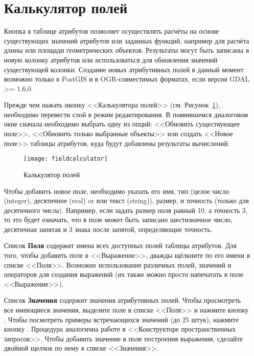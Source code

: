\section{Калькулятор полей}\label{sec:field_calculator}

Кнопка  в
таблице атрибутов позволяет осуществлять расчёты на основе существующих
значений атрибутов или заданных функций, например для расчёта длины или
площади геометрических объектов. Результаты могут быть записаны в новую
колонку атрибутов или использоваться для обновления значений существующей
колонки. Создание новых атрибутивных полей в данный момент возможно только
в PostGIS и в OGR-совместимых форматах, если версия GDAL >= 1.6.0.

Прежде чем нажать иконку <<Калькулятора полей>> (см. Рисунок~\ref{fig:field_calculator}),
необходимо перевести слой в режим редактирования. В появившемся диалоговом
окне сначала необходимо выбрать одну из опций: <<Обновить существующее поле>>,
<<Обновить только выбранные объекты>> или создать <<Новое поле>> таблицы
атрибутов, куда будут добавлены результаты вычислений.

\begin{figure}[ht]
  \centering
    \texttt{[image: fieldcalculator]}
    \caption{Калькулятор полей \nixcaption}\label{fig:field_calculator}
\end{figure}

Чтобы добавить новое поле, необходимо указать его имя, тип (целое число
(integer), десятичное (real) or или текст (string)), размер, и точность
(только для десятичного числа). Например, если задать размер поля равный
10, а точность 3, то это будет означать, что в поле может быть записано
шестизначное число, десятичная запятая и 3 знака после запятой, определяющие
точность.

Список \textbf{Поля} содержит имена всех доступных полей таблицы атрибутов.
Для того, чтобы добавить поле в <<Выражение>>, дважды щёлкните по его имени
в списке <<Поля>>. Возможно использование различных полей, значений и
операторов для создания выражений (их также можно просто напечатать в
поле <<Выражение>>).

Список \textbf{Значения} содержит значения атрибутивных полей. Чтобы
просмотреть все имеющиеся значения, выделите поле в списке <<Поля>> и
нажмите кнопку  .
Чтобы посмотреть примеры встречающихся значений (до 25 штук), нажмите
кнопку  .
Процедура аналогична работе в <<Конструкторе пространственных запросов>>.
Чтобы добавить значение в поле построения выражения, сделайте двойной
щелчок по нему в списке <<Значения>>.

